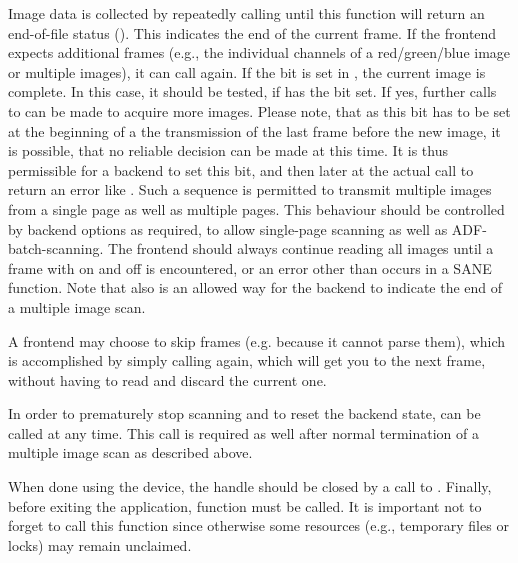\documentclass[11pt,DVIps]{report}
\begin{document}
\begin{changebar}
Image data is collected by repeatedly calling 
until this function will return an end-of-file status
().  This indicates the end of the current
frame. If the frontend expects additional frames (e.g., the
individual channels of a red/green/blue image or multiple images),
it can call  again.
If the  bit is set in , the
current image is complete. In this case, it should be tested, if
 has the  bit set.
If yes, further calls to  can be made to acquire
more images. Please note, that as this bit has to be set at the beginning
of a the transmission of the last frame before the new image, it is possible,
that no reliable decision can be made at this time. It is thus permissible
for a backend to set this bit, and then later at the actual call to
 return an error like . 
Such a sequence is permitted to transmit multiple images from a single 
page as well as multiple pages. This behaviour should be controlled by 
backend options as required, to allow single-page scanning as well as 
ADF-batch-scanning. The frontend should always continue reading all images 
until a frame with  on
and  off is encountered, or an error other
than  occurs in a SANE function.
Note that  also is an allowed way for the backend
to indicate the end of a multiple image scan.

A frontend may choose to skip frames (e.g. because it cannot parse them), 
which is accomplished by simply calling  again, which will get 
you to the next frame, without having to read and discard the current one.

In order to prematurely stop scanning and to reset the backend state, 
 can be called at any time. This call is required 
as well after normal termination of a multiple image scan as described above.
\end{changebar}

When done using the device, the handle should be closed by a call to
.  Finally, before exiting the application,
function  must be called.  It is important not to
forget to call this function since otherwise some resources (e.g.,
temporary files or locks) may remain unclaimed.
\end{document}
